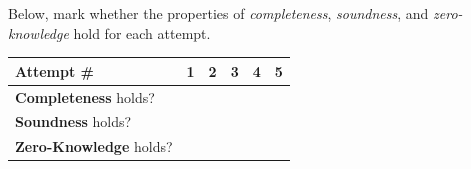 \documentclass{zkdl-tests-template}
\begin{document}
\begin{tcolorbox}[colback=gray!10!white,fonttitle=\bfseries,colframe=purple!80!black,title=Exercises 1-5. Schnorr's Identification Protocol: ]
    Below, mark whether the properties of \textit{completeness}, \textit{soundness}, and \textit{zero-knowledge} hold for each attempt.

    \begin{center}
    \begin{tabular}{ |l|c|c|c|c|c| } 
        \hline
        \textbf{Attempt \#} & \textbf{1} & \textbf{2} & \textbf{3} & \textbf{4} & \textbf{5} \\ \hline
        \textbf{Completeness} holds? & & & & & \\ \hline
        \textbf{Soundness} holds? & & & & & \\ \hline
        \textbf{Zero-Knowledge} holds? & & & & & \\ \hline
    \end{tabular}
    \end{center}

\end{tcolorbox}
\end{document}
